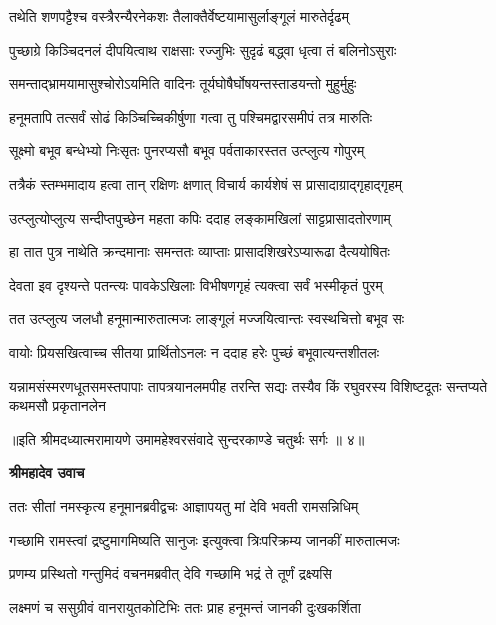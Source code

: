 \twolineshloka
{तथेति शणपट्टैश्च वस्त्रैरन्यैरनेकशः}
{तैलाक्तैर्वेष्टयामासुर्लाङ्गूलं मारुतेर्दृढम्} %

\twolineshloka
{पुच्छाग्रे किञ्चिदनलं दीपयित्वाथ राक्षसाः}
{रज्जुभिः सुदृढं बद्ध्वा धृत्वा तं बलिनोऽसुराः} %

\twolineshloka
{समन्ताद्भ्रामयामासुश्चोरोऽयमिति वादिनः}
{तूर्यघोषैर्घोषयन्तस्ताडयन्तो मुहुर्मुहुः} %

\twolineshloka
{हनूमतापि तत्सर्वं सोढं किञ्चिच्चिकीर्षुणा}
{गत्वा तु पश्चिमद्वारसमीपं तत्र मारुतिः} %

\twolineshloka
{सूक्ष्मो बभूव बन्धेभ्यो निःसृतः पुनरप्यसौ}
{बभूव पर्वताकारस्तत उत्प्लुत्य गोपुरम्} %

\twolineshloka
{तत्रैकं स्तम्भमादाय हत्वा तान् रक्षिणः क्षणात्}
{विचार्य कार्यशेषं स प्रासादाग्राद्गृहाद्गृहम्} %

\twolineshloka
{उत्प्लुत्योप्लुत्य सन्दीप्तपुच्छेन महता कपिः}
{ददाह लङ्कामखिलां साट्टप्रासादतोरणाम्} %

\twolineshloka
{हा तात पुत्र नाथेति क्रन्दमानाः समन्ततः}
{व्याप्ताः प्रासादशिखरेऽप्यारूढा दैत्ययोषितः} %

\twolineshloka
{देवता इव दृश्यन्ते पतन्त्यः पावकेऽखिलाः}
{विभीषणगृहं त्यक्त्वा सर्वं भस्मीकृतं पुरम्} %

\twolineshloka
{तत उत्प्लुत्य जलधौ हनूमान्मारुतात्मजः}
{लाङ्गूलं मज्जयित्वान्तः स्वस्थचित्तो बभूव सः} %

\twolineshloka
{वायोः प्रियसखित्वाच्च सीतया प्रार्थितोऽनलः}
{न ददाह हरेः पुच्छं बभूवात्यन्तशीतलः} %

\fourlineindentedshloka
{यन्नामसंस्मरणधूतसमस्तपापाः}
{तापत्रयानलमपीह तरन्ति सद्यः}
{तस्यैव किं रघुवरस्य विशिष्टदूतः}
{सन्तप्यते कथमसौ प्रकृतानलेन} %

{॥इति श्रीमदध्यात्मरामायणे उमामहेश्वरसंवादे सुन्दरकाण्डे
चतुर्थः सर्गः ॥ ४॥
}




\textbf{श्रीमहादेव उवाच}

\twolineshloka
{ततः सीतां नमस्कृत्य हनूमानब्रवीद्वचः}
{आज्ञापयतु मां देवि भवती रामसन्निधिम्} %

\twolineshloka
{गच्छामि रामस्त्वां द्रष्टुमागमिष्यति सानुजः}
{इत्युक्त्वा त्रिःपरिक्रम्य जानकीं मारुतात्मजः} %

\twolineshloka
{प्रणम्य प्रस्थितो गन्तुमिदं वचनमब्रवीत्}
{देवि गच्छामि भद्रं ते तूर्णं द्रक्ष्यसि} %

\twolineshloka
{लक्ष्मणं च ससुग्रीवं वानरायुतकोटिभिः}
{ततः प्राह हनूमन्तं जानकी दुःखकर्शिता} %

